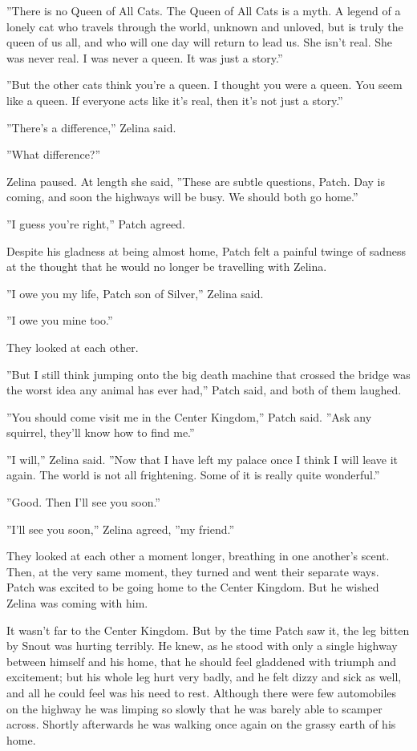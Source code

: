 \documentclass[12pt]{book}
\begin{document}
 ''There is no Queen of All Cats. The Queen of All Cats is a myth. A legend of a lonely cat who travels through the world, unknown and unloved, but is truly the queen of us all, and who will one day will return to lead us. She isn't real. She was never real. I was never a queen. It was just a story.''\par
 ''But the other cats think you're a queen. I thought you were a queen. You seem like a queen. If everyone acts like it's real, then it's not just a story.''\par
 ''There's a difference,'' Zelina said.\par
 ''What difference?''\par
 Zelina paused. At length she said, ''These are subtle questions, Patch. Day is coming, and soon the highways will be busy. We should both go home.''\par
 ''I guess you're right,'' Patch agreed.\par
 Despite his gladness at being almost home, Patch felt a painful twinge of sadness at the thought that he would no longer be travelling with Zelina.\par
 ''I owe you my life, Patch son of Silver,'' Zelina said.\par
 ''I owe you mine too.''\par
 They looked at each other.\par
 ''But I still think jumping onto the big death machine that crossed the bridge was the worst idea any animal has ever had,'' Patch said, and both of them laughed.\par
''You should come visit me in the Center Kingdom,'' Patch said. ''Ask any squirrel, they'll know how to find me.''\par
 ''I will,'' Zelina said. ''Now that I have left my palace once I think I will leave it again. The world is not all frightening. Some of it is really quite wonderful.''\par
 ''Good. Then I'll see you soon.''\par
 ''I'll see you soon,'' Zelina agreed, ''my friend.''\par
 They looked at each other a moment longer, breathing in one another's scent. Then, at the very same moment, they turned and went their separate ways. Patch was excited to be going home to the Center Kingdom. But he wished Zelina was coming with him.\par
 It wasn't far to the Center Kingdom. But by the time Patch saw it, the leg bitten by Snout was hurting terribly. He knew, as he stood with only a single highway between himself and his home, that he should feel gladdened with triumph and excitement; but his whole leg hurt very badly, and he felt dizzy and sick as well, and all he could feel was his need to rest. Although there were few automobiles on the highway he was limping so slowly that he was barely able to scamper across. Shortly afterwards he was walking once again on the grassy earth of his home.\par
\end{document}
